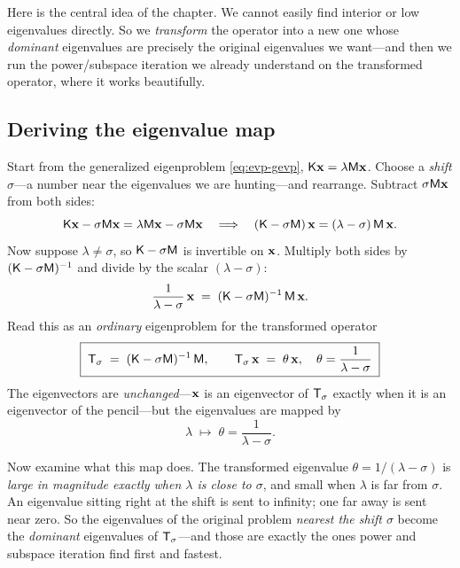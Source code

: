 Here is the central idea of the chapter. We cannot easily find interior or low
eigenvalues directly. So we \emph{transform} the operator into a new one whose
\emph{dominant} eigenvalues are precisely the original eigenvalues we want---and
then we run the power/subspace iteration we already understand on the transformed
operator, where it works beautifully.

\subsection{Deriving the eigenvalue map}

Start from the generalized eigenproblem \cref{eq:evp-gevp},
$\mathsf{K}\mathbf{x}=\lambda\mathsf{M}\mathbf{x}$. Choose a \emph{shift} $\sigma$---a number near the
eigenvalues we are hunting---and rearrange. Subtract $\sigma\mathsf{M}\mathbf{x}$ from both
sides:
\begin{equation}
  \mathsf{K}\mathbf{x} - \sigma\mathsf{M}\mathbf{x} = \lambda\mathsf{M}\mathbf{x} - \sigma\mathsf{M}\mathbf{x}
  \quad\Longrightarrow\quad
  (\mathsf{K}-\sigma\mathsf{M})\,\mathbf{x} = (\lambda-\sigma)\,\mathsf{M}\,\mathbf{x} .
\end{equation}
Now suppose $\lambda\neq\sigma$, so $\mathsf{K}-\sigma\mathsf{M}$ is invertible on $\mathbf{x}$.
Multiply both sides by $(\mathsf{K}-\sigma\mathsf{M})^{-1}$ and divide by the scalar
$(\lambda-\sigma)$:
\begin{equation}
  \frac{1}{\lambda-\sigma}\,\mathbf{x}
    \;=\; (\mathsf{K}-\sigma\mathsf{M})^{-1}\,\mathsf{M}\,\mathbf{x} .
\end{equation}
Read this as an \emph{ordinary} eigenproblem for the transformed operator
\begin{equation}
  \boxed{\;\mathsf{T}_\sigma \;=\; (\mathsf{K}-\sigma\mathsf{M})^{-1}\,\mathsf{M},
    \qquad \mathsf{T}_\sigma\,\mathbf{x} \;=\; \theta\,\mathbf{x},
    \quad \theta=\frac{1}{\lambda-\sigma}\;}
  \label{eq:shift-invert}
\end{equation}
The eigenvectors are \emph{unchanged}---$\mathbf{x}$ is an eigenvector of $\mathsf{T}_\sigma$
exactly when it is an eigenvector of the pencil---but the eigenvalues are mapped
by
\begin{equation}
  \lambda \;\longmapsto\; \theta = \frac{1}{\lambda-\sigma}.
  \label{eq:eigmap}
\end{equation}

Now examine what this map does. The transformed eigenvalue $\theta=1/(\lambda
-\sigma)$ is \emph{large in magnitude exactly when $\lambda$ is close to
$\sigma$}, and small when $\lambda$ is far from $\sigma$. An eigenvalue sitting
right at the shift is sent to infinity; one far away is sent near zero. So the
eigenvalues of the original problem \emph{nearest the shift $\sigma$} become the
\emph{dominant} eigenvalues of $\mathsf{T}_\sigma$---and those are exactly the ones
power and subspace iteration find first and fastest.

